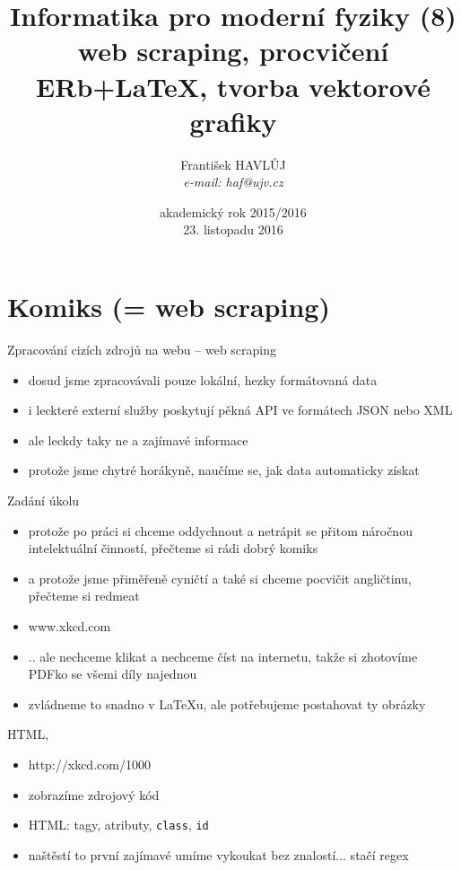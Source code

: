 \documentclass{beamer}
\title[IMF (11)]{Informatika pro moderní fyziky (8)\\ web scraping, procvičení ERb+LaTeX, tvorba vektorové grafiky}
\author[Franti\v{s}ek HAVL\r{U}J, ORF ÚJV Řež]{Franti\v{s}ek HAVL\r{U}J\\{\scriptsize \emph{e-mail: haf@ujv.cz}}}
\date{akademický rok 2015/2016\\23. listopadu 2016}
\institute[ORF ÚJV Řež]
{ÚJV Řež\\oddělení Reaktorové fyziky a podpory palivového cyklu}
\begin{document}
\begin{frame}
  \titlepage
\end{frame}

\begin{frame}
  \tableofcontents
\end{frame}

\section{Komiks (= web scraping)}

\begin{frame}{Zpracování cizích zdrojů na webu -- web scraping}
  \begin{itemize}
    \item dosud jsme zpracovávali pouze lokální, hezky formátovaná data
    \item i leckteré externí služby poskytují pěkná API ve formátech JSON nebo XML
    \item ale leckdy taky ne a zajímavé informace
    \item protože jsme chytré horákyně, naučíme se, jak data automaticky získat
  \end{itemize}
\end{frame}

\begin{frame}{Zadání úkolu}
  \begin{itemize}
    \item protože po práci si chceme oddychnout a netrápit se přitom náročnou intelektuální činností, přečteme si rádi dobrý komiks
    \item a protože jsme přiměřeně cyničtí a také si chceme pocvičit angličtinu, přečteme si redmeat
    \item www.xkcd.com
    \item .. ale nechceme klikat a nechceme číst na internetu, takže si zhotovíme PDFko se všemi díly najednou
    \item zvládneme to snadno v LaTeXu, ale potřebujeme postahovat ty obrázky
  \end{itemize}
\end{frame}

\begin{frame}{HTML, }
  \begin{itemize}
    \item http://xkcd.com/1000
    \item zobrazíme zdrojový kód
    \item HTML: tagy, atributy, \texttt{class}, \texttt{id}
    \item naštěstí to první zajímavé umíme vykoukat bez znalostí... stačí regex
  \end{itemize}
\end{frame}
\end{document}
